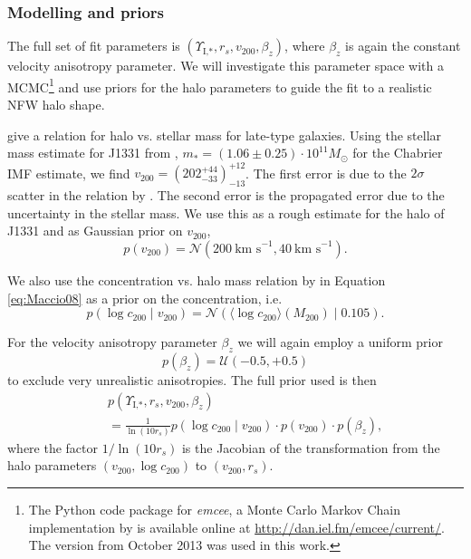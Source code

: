 \documentclass[useAMS,usenatbib]{mnras}
\begin{document}
\subsubsection{Modelling and priors}

The full set of fit parameters is $(\Upsilon_\text{I,*},r_s,v_{200},\beta_z)$, where $\beta_z$ is again the constant velocity anisotropy parameter. We will investigate this parameter space with a MCMC\footnote{The Python code package for \emph{emcee}, a Monte Carlo Markov Chain implementation by \citet{emcee} is available online at \url{http://dan.iel.fm/emcee/current/}. The version from October 2013 was used in this work.} \citep{emcee} and use priors for the halo parameters to guide the fit to a realistic NFW halo shape.

\citet{Dutton10} give a relation for halo vs. stellar mass for late-type galaxies. Using the stellar mass estimate for J1331 from \citet{SWELLSI}, $m_* = (1.06 \pm 0.25) \cdot 10^{11} M_\odot$ for the Chabrier IMF estimate, we find ${v_{200}} = (202_{-33}^{+44})_{-13}^{+12}$. The first error is due to the $2\sigma$ scatter in the relation by \citet{Dutton10}. The second error is the propagated error due to the uncertainty in the stellar mass. We use this as a rough estimate for the halo of J1331 and as Gaussian prior on $v_{200}$, 
\begin{equation}
p(v_{200}) = \mathscr{N}(200~\text{km s}^{-1},40~\text{km s}^{-1}). \label{eq:prior_v200}
\end{equation}

We also use the concentration vs. halo mass relation by \citet{Maccio08} in Equation \eqref{eq:Maccio08} as a prior on the concentration, i.e.
\begin{equation}
p(\log c_{200} \mid v_{200}) = \mathscr{N}\left(\langle \log c_{200} \rangle (M_{200}) \mid 0.105 \right). \label{eq:prior_c200}
\end{equation}

For the velocity anisotropy parameter $\beta_z$ we will again employ a uniform prior 
\begin{equation*}
p(\beta_z) = \mathscr{U}(-0.5,+0.5)
\end{equation*}
to exclude very unrealistic anisotropies. The full prior used is then
\begin{eqnarray*}
&&p(\Upsilon_\text{I,*},r_s,v_{200},\beta_z) \\
&&= \frac{1}{\ln\left( 10 r_s\right)} p(\log c_{200} \mid v_{200}) \cdot p(v_{200}) \cdot p(\beta_z), 
\end{eqnarray*}
where the factor $1/\ln\left( 10 r_s\right)$ is the Jacobian of the transformation from the halo parameters $(v_{200},\log c_{200})$ to $(v_{200},r_s)$.
\end{document}
